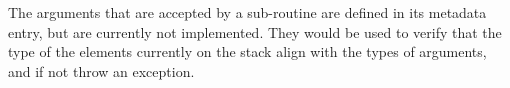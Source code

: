 The arguments that are accepted by a sub-routine are defined in its metadata
entry, but are currently not implemented. They would be used to verify that the
type of the elements currently on the stack align with the types of arguments,
and if not throw an exception.


